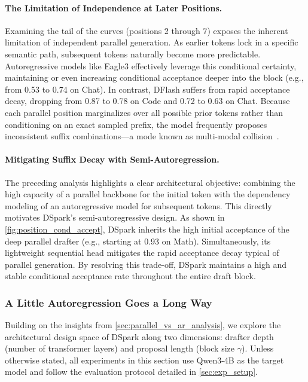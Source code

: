 \paragraph{The Limitation of Independence at Later Positions.} 
Examining the tail of the curves (positions 2 through 7) exposes the inherent limitation of independent parallel generation. As earlier tokens lock in a specific semantic path, subsequent tokens naturally become more predictable. Autoregressive models like Eagle3 effectively leverage this conditional certainty, maintaining or even increasing conditional acceptance deeper into the block (e.g., from 0.53 to 0.74 on Chat). In contrast, DFlash suffers from rapid acceptance decay, dropping from 0.87 to 0.78 on Code and 0.72 to 0.63 on Chat. Because each parallel position marginalizes over all possible prior tokens rather than conditioning on an exact sampled prefix, the model frequently proposes inconsistent suffix combinations—a mode known as multi-modal collision~\citep{gu2018nonautoregressive,stern2018blockwiseparalleldecodingdeep}.

\paragraph{Mitigating Suffix Decay with Semi-Autoregression.}
The preceding analysis highlights a clear architectural objective: combining the high capacity of a parallel backbone for the initial token with the dependency modeling of an autoregressive model for subsequent tokens. This directly motivates DSpark's semi-autoregressive design. As shown in \autoref{fig:position_cond_accept}, DSpark inherits the high initial acceptance of the deep parallel drafter (e.g., starting at 0.93 on Math). Simultaneously, its lightweight sequential head mitigates the rapid acceptance decay typical of parallel generation. By resolving this trade-off, DSpark maintains a high and stable conditional acceptance rate throughout the entire draft block.

\subsubsection{A Little Autoregression Goes a Long Way}  
\label{sec:exp_depth_width}  

Building on the insights from \autoref{sec:parallel_vs_ar_analysis}, we explore the architectural design space of DSpark along two dimensions: drafter depth (number of transformer layers) and proposal length (block size $\gamma$).  
Unless otherwise stated, all experiments in this section use Qwen3-4B as the target model and follow the evaluation protocol detailed in \autoref{sec:exp_setup}.

